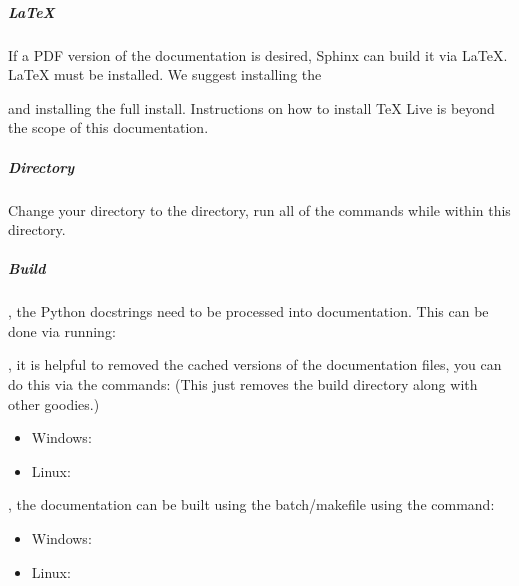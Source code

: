\documentclass[letterpaper,11pt,english]{sphinxmanual}
\begin{document}
\subparagraph{LaTeX}
\label{\detokenize{technical/installation/documentation:latex}}
\sphinxAtStartPar
If a PDF version of the documentation is desired, Sphinx can build it via
LaTeX. LaTeX must be installed. We suggest installing the
%
\begin{footnote}[28]\sphinxAtStartFootnote
{}
%
\end{footnote} and installing the full install. Instructions on
how to install TeX Live is beyond the scope of this documentation.


\subparagraph{Directory}
\label{\detokenize{technical/installation/documentation:directory}}
\sphinxAtStartPar
Change your directory to the  directory, run all of the
commands while within this directory.


\subparagraph{Build}
\label{\detokenize{technical/installation/documentation:build}}
\sphinxAtStartPar
{}, the Python docstrings need to be processed into documentation. This
can be done via running:

\begin{sphinxVerbatim}[commandchars=\\\{\}]
     
\end{sphinxVerbatim}

\sphinxAtStartPar
{}, it is helpful to removed the cached versions of the documentation
files, you can do this via the commands: (This just removes the build directory
along with other goodies.)
\begin{itemize}
\item {} 
\sphinxAtStartPar
Windows: 

\item {} 
\sphinxAtStartPar
Linux: 

\end{itemize}

\sphinxAtStartPar
{}, the documentation can be built using the batch/makefile using the
command:
\begin{itemize}
\item {} 
\sphinxAtStartPar
Windows: 

\item {} 
\sphinxAtStartPar
Linux: 

\end{itemize}
\end{document}
